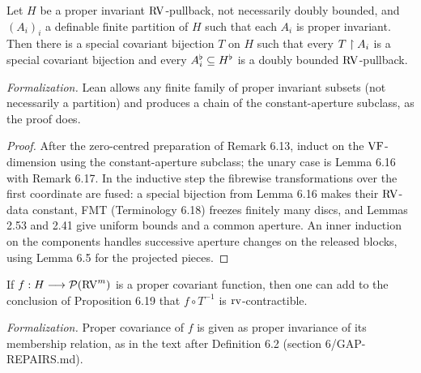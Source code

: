 \setcounter{theorem}{18}
\begin{proposition}
\label{simplex-with-hole-rvproduct}
\leanok
{}
Let $H$ be a proper invariant $\mathrm{RV}$-pullback, not necessarily doubly bounded, and $(A_i)_i$ a definable finite partition of $H$ such that each $A_i$ is proper invariant. Then there is a special covariant bijection $T$ on $H$ such that every $T\upharpoonright A_i$ is a special covariant bijection and every $A_i^\flat\subseteq H^\flat$ is a doubly bounded $\mathrm{RV}$-pullback.

\emph{Formalization.} Lean allows any finite family of proper invariant subsets (not necessarily a partition) and produces a chain of the constant-aperture subclass, as the proof does.
\end{proposition}

\begin{proof}
\leanok
After the zero-centred preparation of Remark 6.13, induct on the $\mathrm{VF}$-dimension using the constant-aperture subclass; the unary case is Lemma 6.16 with Remark 6.17. In the inductive step the fibrewise transformations over the first coordinate are fused: a special bijection from Lemma 6.16 makes their $\mathrm{RV}$-data constant, FMT (Terminology 6.18) freezes finitely many discs, and Lemmas 2.53 and 2.41 give uniform bounds and a common aperture. An inner induction on the components handles successive aperture changes on the released blocks, using Lemma 6.5 for the projected pieces.
\end{proof}

\setcounter{theorem}{19}
\begin{remark}
\label{cons-extra}
\leanok
{}
If $f:H\longrightarrow\mathcal{P}(\mathrm{RV}^m)$ is a proper covariant function, then one can add to the conclusion of Proposition 6.19 that $f\circ T^{-1}$ is $\operatorname{rv}$-contractible.

\emph{Formalization.} Proper covariance of $f$ is given as proper invariance of its membership relation, as in the text after Definition 6.2 (section 6/GAP-REPAIRS.md).
\end{remark}


